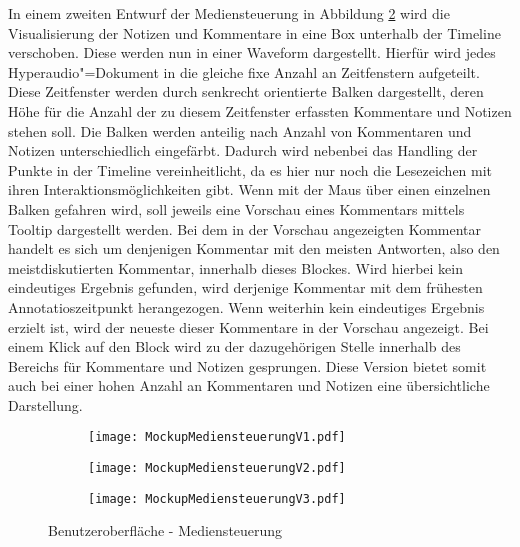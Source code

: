 In einem zweiten Entwurf der Mediensteuerung in Abbildung \ref{fig:MockupMediensteuerungV2} wird die Visualisierung der Notizen und Kommentare in eine Box unterhalb der Timeline verschoben. Diese werden nun in einer Waveform dargestellt. Hierfür wird jedes Hyperaudio"=Dokument in die gleiche fixe Anzahl an Zeitfenstern aufgeteilt. Diese Zeitfenster werden durch senkrecht orientierte Balken dargestellt, deren Höhe für die Anzahl der zu diesem Zeitfenster erfassten Kommentare und Notizen stehen soll. Die Balken werden anteilig nach Anzahl von Kommentaren und Notizen unterschiedlich eingefärbt. Dadurch wird nebenbei das Handling der Punkte in der Timeline vereinheitlicht, da es hier nur noch die Lesezeichen mit ihren Interaktionsmöglichkeiten gibt. Wenn mit der Maus über einen einzelnen Balken gefahren wird, soll jeweils eine Vorschau eines Kommentars mittels Tooltip dargestellt werden. Bei dem in der Vorschau angezeigten Kommentar handelt es sich um denjenigen Kommentar mit den meisten Antworten, also den meistdiskutierten Kommentar, innerhalb dieses Blockes. Wird hierbei kein eindeutiges Ergebnis gefunden, wird derjenige Kommentar mit dem frühesten Annotatioszeitpunkt herangezogen. Wenn weiterhin kein eindeutiges Ergebnis erzielt ist, wird der neueste dieser Kommentare in der Vorschau angezeigt. Bei einem Klick auf den Block wird zu der dazugehörigen Stelle innerhalb des Bereichs für Kommentare und Notizen gesprungen. Diese Version bietet somit auch bei einer hohen Anzahl an Kommentaren und Notizen eine übersichtliche Darstellung.

\begin{figure}[h!]
\begin{subfigure}[c]{\textwidth}
\texttt{[image: MockupMediensteuerungV1.pdf]}
\label{fig:MockupMediensteuerungV1}
\end{subfigure}
\par\bigskip
\begin{subfigure}[c]{\textwidth}
\texttt{[image: MockupMediensteuerungV2.pdf]}
\label{fig:MockupMediensteuerungV2}
\end{subfigure}
\par\bigskip
\begin{subfigure}[c]{\textwidth}
\texttt{[image: MockupMediensteuerungV3.pdf]}
\label{fig:MockupMediensteuerungV3}
\end{subfigure}
\caption{Benutzeroberfläche - Mediensteuerung}
\label{fig:MockupMediensteuerung}
\end{figure}

